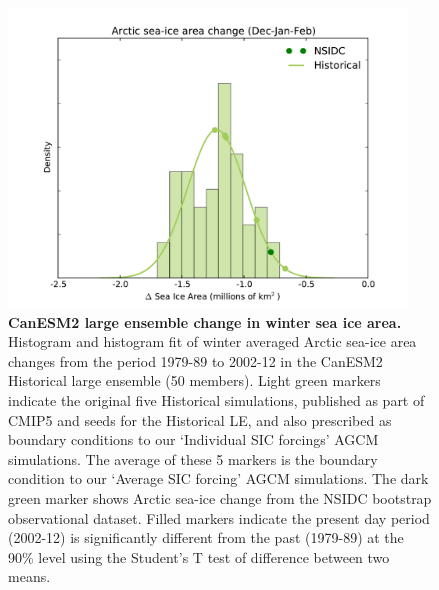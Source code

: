 \documentclass{nature}
\begin{document}
\begin{figure}%
\centering
\noindent\includegraphics[width=25pc]{Figure2b.pdf}
\caption{\textbf{CanESM2 large ensemble change in winter sea ice area.} Histogram and histogram fit of winter averaged Arctic sea-ice area changes from the period 1979-89 to 2002-12 in the CanESM2 Historical large ensemble (50 members). Light green markers indicate the original five Historical simulations, published as part of CMIP5 and seeds for the Historical LE, and also prescribed as boundary conditions to our `Individual SIC forcings' AGCM simulations. The average of these 5 markers is the boundary condition to our `Average SIC forcing' AGCM simulations. The dark green marker shows Arctic sea-ice change from the NSIDC bootstrap observational dataset. Filled markers indicate the present day period (2002-12) is significantly different from the past (1979-89) at the 90\% level using the Student’s T test of difference between two means. 
}
\label{fig:fig2} 
\end{figure}
\end{document}
